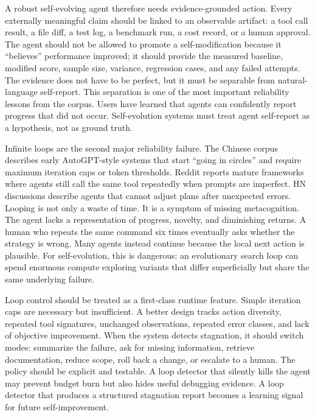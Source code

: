 A robust self-evolving agent therefore needs evidence-grounded action. Every externally meaningful claim should be linked to an observable artifact: a tool call result, a file diff, a test log, a benchmark run, a cost record, or a human approval. The agent should not be allowed to promote a self-modification because it ``believes'' performance improved; it should provide the measured baseline, modified score, sample size, variance, regression cases, and any failed attempts. The evidence does not have to be perfect, but it must be separable from natural-language self-report. This separation is one of the most important reliability lessons from the corpus. Users have learned that agents can confidently report progress that did not occur. Self-evolution systems must treat agent self-report as a hypothesis, not as ground truth.

Infinite loops are the second major reliability failure. The Chinese corpus describes early AutoGPT-style systems that start ``going in circles'' and require maximum iteration caps or token thresholds. Reddit reports mature frameworks where agents still call the same tool repeatedly when prompts are imperfect. HN discussions describe agents that cannot adjust plans after unexpected errors. Looping is not only a waste of time. It is a symptom of missing metacognition. The agent lacks a representation of progress, novelty, and diminishing returns. A human who repeats the same command six times eventually asks whether the strategy is wrong. Many agents instead continue because the local next action is plausible. For self-evolution, this is dangerous: an evolutionary search loop can spend enormous compute exploring variants that differ superficially but share the same underlying failure.

Loop control should be treated as a first-class runtime feature. Simple iteration caps are necessary but insufficient. A better design tracks action diversity, repeated tool signatures, unchanged observations, repeated error classes, and lack of objective improvement. When the system detects stagnation, it should switch modes: summarize the failure, ask for missing information, retrieve documentation, reduce scope, roll back a change, or escalate to a human. The policy should be explicit and testable. A loop detector that silently kills the agent may prevent budget burn but also hides useful debugging evidence. A loop detector that produces a structured stagnation report becomes a learning signal for future self-improvement.

